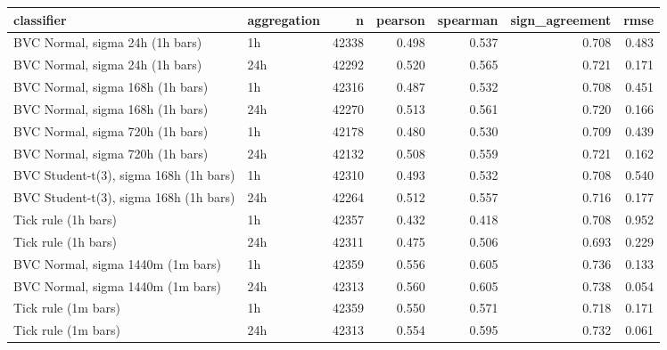\begin{tabular}{llrrrrr}
\toprule
classifier & aggregation & n & pearson & spearman & sign_agreement & rmse \\
\midrule
BVC Normal, sigma 24h (1h bars) & 1h & 42338 & 0.498 & 0.537 & 0.708 & 0.483 \\
BVC Normal, sigma 24h (1h bars) & 24h & 42292 & 0.520 & 0.565 & 0.721 & 0.171 \\
BVC Normal, sigma 168h (1h bars) & 1h & 42316 & 0.487 & 0.532 & 0.708 & 0.451 \\
BVC Normal, sigma 168h (1h bars) & 24h & 42270 & 0.513 & 0.561 & 0.720 & 0.166 \\
BVC Normal, sigma 720h (1h bars) & 1h & 42178 & 0.480 & 0.530 & 0.709 & 0.439 \\
BVC Normal, sigma 720h (1h bars) & 24h & 42132 & 0.508 & 0.559 & 0.721 & 0.162 \\
BVC Student-t(3), sigma 168h (1h bars) & 1h & 42310 & 0.493 & 0.532 & 0.708 & 0.540 \\
BVC Student-t(3), sigma 168h (1h bars) & 24h & 42264 & 0.512 & 0.557 & 0.716 & 0.177 \\
Tick rule (1h bars) & 1h & 42357 & 0.432 & 0.418 & 0.708 & 0.952 \\
Tick rule (1h bars) & 24h & 42311 & 0.475 & 0.506 & 0.693 & 0.229 \\
BVC Normal, sigma 1440m (1m bars) & 1h & 42359 & 0.556 & 0.605 & 0.736 & 0.133 \\
BVC Normal, sigma 1440m (1m bars) & 24h & 42313 & 0.560 & 0.605 & 0.738 & 0.054 \\
Tick rule (1m bars) & 1h & 42359 & 0.550 & 0.571 & 0.718 & 0.171 \\
Tick rule (1m bars) & 24h & 42313 & 0.554 & 0.595 & 0.732 & 0.061 \\
\bottomrule
\end{tabular}
